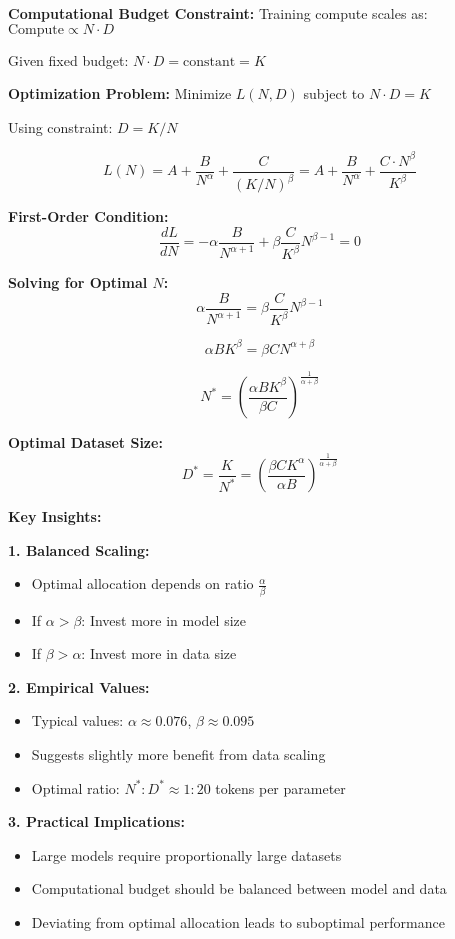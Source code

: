 \documentclass[12pt]{article}
\begin{document}
\begin{center}
\begin{enumerate}[(a)]
{    \textbf{Computational Budget Constraint:}
    Training compute scales as: $\text{Compute} \propto N \cdot D$
    
    Given fixed budget: $N \cdot D = \text{constant} = K$
    
    \textbf{Optimization Problem:}
    Minimize $L(N, D)$ subject to $N \cdot D = K$
    
    Using constraint: $D = K/N$
    
    $$L(N) = A + \frac{B}{N^{\alpha}} + \frac{C}{(K/N)^{\beta}} = A + \frac{B}{N^{\alpha}} + \frac{C \cdot N^{\beta}}{K^{\beta}}$$
    
    \textbf{First-Order Condition:}
    $$\frac{dL}{dN} = -\alpha \frac{B}{N^{\alpha+1}} + \beta \frac{C}{K^{\beta}} N^{\beta-1} = 0$$
    
    \textbf{Solving for Optimal $N$:}
    $$\alpha \frac{B}{N^{\alpha+1}} = \beta \frac{C}{K^{\beta}} N^{\beta-1}$$
    
    $$\alpha B K^{\beta} = \beta C N^{\alpha+\beta}$$
    
    $$N^* = \left(\frac{\alpha B K^{\beta}}{\beta C}\right)^{\frac{1}{\alpha+\beta}}$$
    
    \textbf{Optimal Dataset Size:}
    $$D^* = \frac{K}{N^*} = \left(\frac{\beta C K^{\alpha}}{\alpha B}\right)^{\frac{1}{\alpha+\beta}}$$
    
    \textbf{Key Insights:}
    
    \textbf{1. Balanced Scaling:}
    \begin{itemize}
        \item Optimal allocation depends on ratio $\frac{\alpha}{\beta}$
        \item If $\alpha > \beta$: Invest more in model size
        \item If $\beta > \alpha$: Invest more in data size
    \end{itemize}
    
    \textbf{2. Empirical Values:}
    \begin{itemize}
        \item Typical values: $\alpha \approx 0.076$, $\beta \approx 0.095$
        \item Suggests slightly more benefit from data scaling
        \item Optimal ratio: $N^* : D^* \approx 1 : 20$ tokens per parameter
    \end{itemize}
    
    \textbf{3. Practical Implications:}
    \begin{itemize}
        \item Large models require proportionally large datasets
        \item Computational budget should be balanced between model and data
        \item Deviating from optimal allocation leads to suboptimal performance
    \end{itemize}
    }
\end{enumerate}


\end{center}
\end{document}

